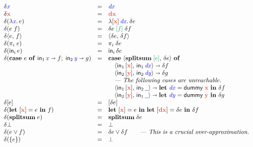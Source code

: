 \documentclass{rntz}
\newcommand{\dummy}{\ms{dummy}}
\newcommand{\preserve}[1]{{\color{ForestGreen}{#1}}}
\newcommand{\preservedisc}[1]{\preserve{\disc{#1}}}
\newcommand{\comment}[1]{\textit{--- {#1}}}
\begin{document}
\begin{figure*}
  \[
  \begin{array}{lcll}
    \delta \m{x} &=& \m{dx}\\
    \delta \d{x} &=& \d{dx}\\
    \delta(\lam{\m{x}} e) &=&
    \lam{\disc{\d{x}} \, \m{dx}} \delta e\\
    \delta(e\;f) &=& \delta e \; \preservedisc{f} \; \delta f\\
    \delta \pair{e}{f} &=& \pair{\delta{e}}{\delta{f}}\\
    \delta(\pi_i\; e) &=& \pi_i\; \delta{e}\\
    \delta(\inj{i}{e}) &=& \inj{i}{\delta{e}}\\

    \delta(\case{e}{\m x}{f}{\m y}{g})
    &=& \mb{case}~ \pair{\splitsum{\preservedisc{e}}}{\delta e} ~\mb{of}\\
     && \quad \pair{\inj{1}{\disc{\d{x}}}}{\inj{1}{\m{dx}}} \cto \delta f\\
     && \quad \pair{\inj{2}{\disc{\d{y}}}}{\inj{2}{\m{dy}}} \cto \delta g\\
     && \quad \comment{The following cases are unreachable.}\\
     && \quad \pair{\inj{1}{\disc{\d{x}}}}{\inj{2}{\m{\pwild}}} \cto
        \letv{\m{dx}}{\dummy\; \d{x}} \delta f\\
     && \quad \pair{\inj{2}{\disc{\d{y}}}}{\inj{1}{\m{\pwild}}} \cto
        \letv{\m{dy}}{\dummy\; \d{y}} \delta g\\

    \delta\disc{e} &=& \disc{\delta e}\\
    \delta(\letdisc{\d{x}}{e} f) &=&
      \letdisc{\d{x}}{e} \letdisc{\d{dx}}{\delta e} \delta f\\

    \delta(\splitsum{e}) &=&
    \splitsum{\delta e}\\
    \delta \unit &=& \unit\\
    \delta(e \vee f) &=& \delta e \vee \delta f
    \qquad \comment{This is a crucial over-approximation.}\\
    \delta(\single{e}) &=& \unit\\


\end{array}\]
\end{figure*}
\end{document}
